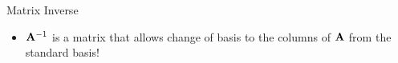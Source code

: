 \documentclass[aspectratio=169]{beamer}
\let\olditem\item
\renewcommand{\item}{\setlength{\itemsep}{\fill}\olditem}
\def\mf{\ensuremath\mathbf}
\def\lc{\ensuremath\left\{}
\def\rc{\ensuremath\right\}}
\begin{document}
\begin{frame}[t]{Matrix Inverse}
\begin{itemize}
    \item $\mf{A}^{-1}$ is a matrix that allows change of basis to the columns of $\mf{A}$ from the standard basis!
\end{itemize}
\vspace{1cm}


\end{frame}
\end{document}
